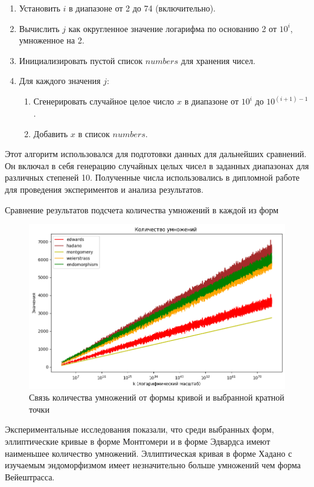 \begin{enumerate}
    \item Установить $i$ в диапазоне от 2 до 74 (включительно).
    \item Вычислить $j$ как округленное значение логарифма по основанию 2 от $10^i$, умноженное на 2.
    \item Инициализировать пустой список $numbers$ для хранения чисел.
    \item Для каждого значения $j$:
        \begin{enumerate}
            \item Сгенерировать случайное целое число $x$ в диапазоне от $10^i$ до $10^{(i+1) - 1}$.
            \item Добавить $x$ в список $numbers$.
        \end{enumerate}
\end{enumerate}

Этот алгоритм использовался для подготовки данных для дальнейших сравнений. Он включал в себя генерацию случайных целых чисел в заданных диапазонах для различных степеней 10. Полученные числа использовались в дипломной работе для проведения экспериментов и анализа результатов.


\pagebreak
Сравнение результатов подсчета количества умножений в каждой из форм 
\begin{figure}[h]
  \centering
  \includegraphics[width=\linewidth]{./multiplication.png}
  \caption{Связь количества умножений от формы кривой и выбранной кратной точки}
  \end{figure}

Экспериментальные исследования показали, что среди выбранных форм, эллиптические кривые в форме Монтгомери и в форме Эдвардса имеют наименьшее количество умножений. Эллиптическая кривая в форме Хадано с изучаемым эндоморфизмом имеет незначительно больше умножений чем форма Вейештрасса.

